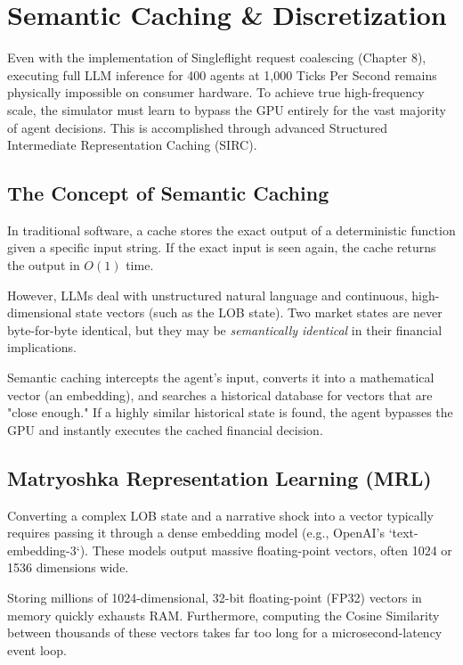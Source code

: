 \chapter{Semantic Caching \& Discretization}
\label{ch:semantic_caching}

Even with the implementation of Singleflight request coalescing (Chapter 8), executing full LLM inference for 400 agents at 1,000 Ticks Per Second remains physically impossible on consumer hardware. To achieve true high-frequency scale, the simulator must learn to bypass the GPU entirely for the vast majority of agent decisions. This is accomplished through advanced Structured Intermediate Representation Caching (SIRC).

\section{The Concept of Semantic Caching}

In traditional software, a cache stores the exact output of a deterministic function given a specific input string. If the exact input is seen again, the cache returns the output in $O(1)$ time. 

However, LLMs deal with unstructured natural language and continuous, high-dimensional state vectors (such as the LOB state). Two market states are never byte-for-byte identical, but they may be \textit{semantically identical} in their financial implications. 

Semantic caching intercepts the agent's input, converts it into a mathematical vector (an embedding), and searches a historical database for vectors that are "close enough." If a highly similar historical state is found, the agent bypasses the GPU and instantly executes the cached financial decision.

\section{Matryoshka Representation Learning (MRL)}

Converting a complex LOB state and a narrative shock into a vector typically requires passing it through a dense embedding model (e.g., OpenAI's `text-embedding-3`). These models output massive floating-point vectors, often 1024 or 1536 dimensions wide. 

Storing millions of 1024-dimensional, 32-bit floating-point (FP32) vectors in memory quickly exhausts RAM. Furthermore, computing the Cosine Similarity between thousands of these vectors takes far too long for a microsecond-latency event loop.


